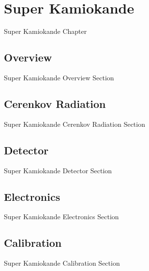 \chapter{Super Kamiokande}
\label{chap:SuperKamiokande}
Super Kamiokande Chapter

\section{Overview}
\label{sec:SuperKamiokande_Overview}
Super Kamiokande Overview Section

\section{Cerenkov Radiation}
\label{sec:SuperKamiokande_CerenkovRadiation}
Super Kamiokande Cerenkov Radiation Section

\section{Detector}
\label{sec:SuperKamiokande_Detector}
Super Kamiokande Detector Section

\section{Electronics}
\label{sec:SuperKamiokande_Electronics}
Super Kamiokande Electronics Section

\section{Calibration}
\label{sec:SuperKamiokande_Calibration}
Super Kamiokande Calibration Section
